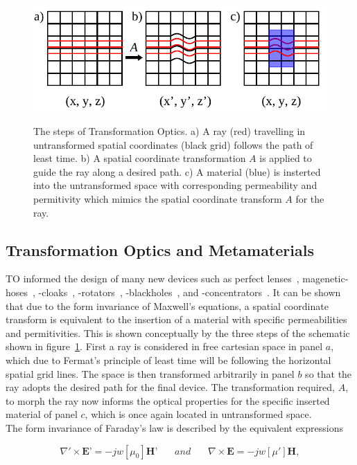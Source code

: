 \documentclass[11pt]{iopart}
\begin{document}
\begin{figure}
  \begin{center}
   \noindent\includegraphics[width=0.75\linewidth]{images/trans_Opt_edit.pdf}
  \label{fig:TO}
  \end{center}
  \caption{The steps of Transformation Optics. a) A ray (red)
    travelling in untransformed spatial coordinates (black grid)
    follows the path of least time. b) A spatial coordinate
    transformation $A$ is applied to guide the ray along a desired
    path. c) A material (blue) is insterted into the untransformed
    space with corresponding permeability and permitivity which mimics
    the spatial coordinate transform $A$ for the ray. }
\end{figure}

\subsection{Transformation Optics and Metamaterials}
TO informed the design of many new devices such as perfect
lenses~\cite{}, magenetic-hoses~\cite{}, -cloaks~\cite{},
-rotators~\cite{}, -blackholes~\cite{}, and -concentrators~\cite{}. It
can be shown that due to the form invariance of Maxwell's equations, a
spatial coordinate transform is equivalent to the insertion of a
material with specific permeabilities and permitivities. This is shown
conceptually by the three steps of the schematic shown in
figure~\ref{fig:TO}. First a ray is considered in free cartesian space
in panel $a$, which due to Fermat's principle of least time will be
following the horizontal spatial grid lines.  The space is then
transformed arbitrarily in panel $b$ so that the ray adopts the
desired path for the final device. The transformation required, $A$,
to morph the ray now informs the optical properties for the specific
inserted material of panel $c$, which is once again located in
untransformed space.\\ The form invariance of Faraday's law is
described by the equivalent expressions

\begin{equation}
  \label{ME1}
  \nabla'\times \textbf{E'} = -jw[\mu_0]\textbf{H'}
  ~~~~~~~~and~~~~~~~~
  \nabla\times \textbf{E} = -jw[\mu']\textbf{H},
\end{equation}
\end{document}
